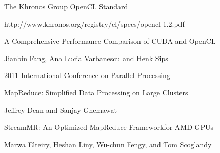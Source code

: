 \documentclass[11pt,a4paper] {scrartcl}   %
\begin{document}
\maketitle
{}

\pagebreak{}


\pagebreak{}


\begin{thebibliography}{9}

\thispagestyle{empty}
\pagestyle{empty}
    The Khronos Group OpenCL Standard

    http://www.khronos.org/registry/cl/specs/opencl-1.2.pdf

    A Comprehensive Performance Comparison of
    CUDA and OpenCL

    Jianbin Fang, Ana Lucia Varbanescu and Henk Sips

    2011 International Conference on Parallel Processing

    MapReduce: Simplified Data Processing on Large Clusters

    Jeffrey Dean and Sanjay Ghemawat

    StreamMR: An Optimized MapReduce Frameworkfor AMD GPUs

    Marwa Elteiry, Heshan Liny, Wu-chun Fengy, and Tom Scoglandy

\thispagestyle{empty}
\pagestyle{empty}
\end{thebibliography}
\end{document}
